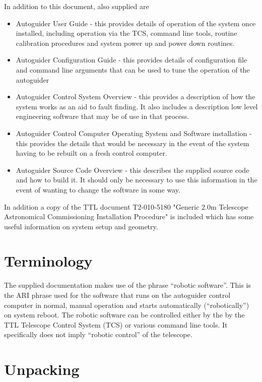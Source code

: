 \documentclass[10pt,a4paper]{article}
\begin{document}
In addition to this document, also supplied are

\begin{itemize}
\item Autoguider User Guide - this provides details of operation of
  the system once installed, including operation via the TCS, command
  line tools, routine calibration procedures and system
  power up and power down routines.
\item Autoguider Configuration Guide - this provides details of configuration file
  and  command line arguments that can be used to tune the operation of the autoguider
\item Autoguider Control System Overview - this provides a description
  of how the system works as an aid to fault finding.  It also
  includes a description low level engineering software that may be of
  use in that process.
\item Autoguider Control Computer Operating System and Software
  installation - this provides the details that would be necessary in
  the event of the system having to be rebuilt on a fresh control
  computer.
\item Autoguider Source Code Overview - this describes the supplied
  source code and how to build it.  It should only be necessary to use
  this information in the event of wanting to change the software in
  some way.
\end{itemize}

In addition a copy of the TTL document T2-010-5180 
"Generic 2.0m Telescope Astronomical Commissioning Installation
Procedure"  
is included which has some useful information on system setup and
geometry.


\section{Terminology}

The supplied documentation makes use of the phrase ``robotic
software''.  This is the ARI phrase used for the software
that runs on the autoguider control computer in normal,
manual operation and starts automatically (``robotically'') on system
reboot.  The robotic software can be controlled
either by the by the TTL Telescope Control System (TCS) or various
command line tools.  It specifically does not imply  ``robotic
control''  of the telescope.

\section{Unpacking}
\end{document}
